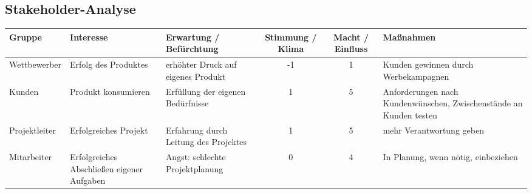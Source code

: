 \begin{landscape}
\begin{center}
\section{Stakeholder-Analyse}
\begin{tabulary}{1.35\textwidth}{|L|L|L|C|C|L|}
\hline 
\textbf{Gruppe} & \textbf{Interesse} & \textbf{Erwartung / Befürchtung} & \textbf{Stimmung / Klima} & \textbf{Macht / Einfluss} & \textbf{Maßnahmen} \\ 
\hline 
Wettbewerber & Erfolg des Produktes & erhöhter Druck auf eigenes Produkt & -1 & 1 & Kunden gewinnen durch Werbekampagnen \\ 
\hline 
Kunden & Produkt konsumieren & Erfüllung der eigenen Bedürfnisse & 1 & 5 & Anforderungen nach Kundenwünschen, Zwischenstände an Kunden testen \\ 
\hline 
Projektleiter & Erfolgreiches Projekt & Erfahrung durch Leitung des Projektes & 1 & 5 & mehr Verantwortung geben \\ 
\hline 
Mitarbeiter & Erfolgreiches Abschließen eigener Aufgaben & Angst: schlechte Projektplanung & 0 & 4 & In Planung, wenn nötig, einbeziehen \\ 
\hline
\end{tabulary} 
 
\end{center}


\end{landscape}
\restoregeometry